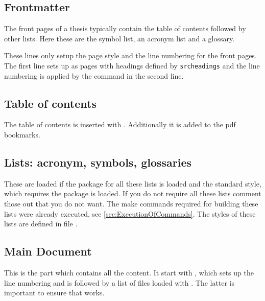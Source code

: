 \subsection{Frontmatter}
The front pages of a thesis typically contain the table of contents followed by other lists. Here these are the symbol list, an acronym list and a glossary.

These lines only setup the page style and the line numbering for the front pages. The first line sets up as pages with headings defined by \texttt{srcheadings} and the line numbering is applied by the command  in the second line.

\subsection{Table of contents}
The table of contents is inserted with . Additionally it is added to the pdf bookmarks.

\subsection{Lists: acronym, symbols, glossaries}
These are loaded if the package for all these lists is loaded and the standard 
style, which requires the  package is loaded. If you do 
not require all these lists comment those out that you do not want. The make 
commands required for building these lists were already executed, see 
\vref{sec:ExecutionOfCommands}. The styles of these lists are defined in file 
.

\subsection{Main Document}
This is the part which contains all the content. It start with , which sets up the line numbering and is followed by a list of files loaded with . The latter is important to ensure that  works.

